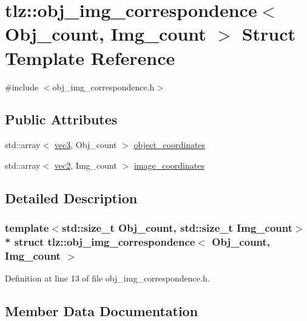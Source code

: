 \hypertarget{structtlz_1_1obj__img__correspondence}{}\section{tlz\+:\+:obj\+\_\+img\+\_\+correspondence$<$ Obj\+\_\+count, Img\+\_\+count $>$ Struct Template Reference}
\label{structtlz_1_1obj__img__correspondence}


{\ttfamily \#include $<$obj\+\_\+img\+\_\+correspondence.\+h$>$}

\subsection*{Public Attributes}
\begin{DoxyCompactItemize}
\item 
std\+::array$<$ \hyperlink{namespacetlz_ad0646d752ddb9d40d702d40cc6dc54a1}{vec3}, Obj\+\_\+count $>$ \hyperlink{structtlz_1_1obj__img__correspondence_afc82702c6c8699a8d725faa2f50d4b87}{object\+\_\+coordinates}
\item 
std\+::array$<$ \hyperlink{namespacetlz_ae192989bfbe6c700ac84d2a8cf05ebb4}{vec2}, Img\+\_\+count $>$ \hyperlink{structtlz_1_1obj__img__correspondence_a81b42710f3354d175e1f38b36c0e83ef}{image\+\_\+coordinates}
\end{DoxyCompactItemize}


\subsection{Detailed Description}
\subsubsection*{template$<$std\+::size\+\_\+t Obj\+\_\+count, std\+::size\+\_\+t Img\+\_\+count$>$\\*
struct tlz\+::obj\+\_\+img\+\_\+correspondence$<$ Obj\+\_\+count, Img\+\_\+count $>$}



Definition at line 13 of file obj\+\_\+img\+\_\+correspondence.\+h.



\subsection{Member Data Documentation}
